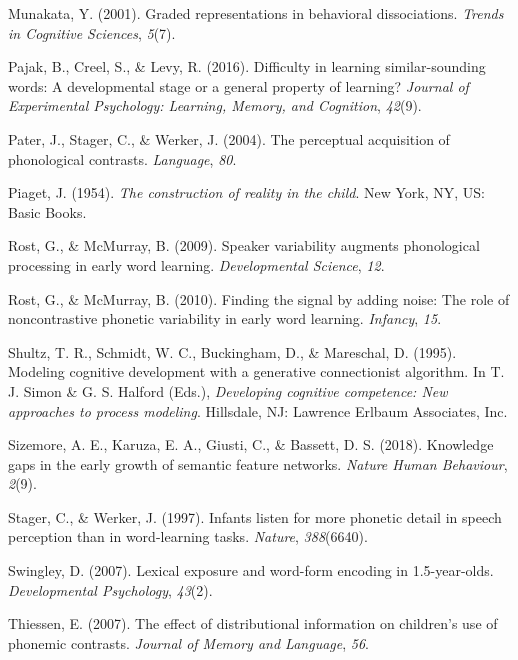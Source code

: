 \documentclass[english,,man]{apa6}
\theoremstyle{definition}
\theoremstyle{definition}
\theoremstyle{definition}
\theoremstyle{remark}
\begin{document}
\hypertarget{ref-Munakata2001}{}
Munakata, Y. (2001). Graded representations in behavioral dissociations.
\emph{Trends in Cognitive Sciences}, \emph{5}(7).

\hypertarget{ref-pajak2016}{}
Pajak, B., Creel, S., \& Levy, R. (2016). Difficulty in learning
similar-sounding words: A developmental stage or a general property of
learning? \emph{Journal of Experimental Psychology: Learning, Memory,
and Cognition}, \emph{42}(9).

\hypertarget{ref-pater2004}{}
Pater, J., Stager, C., \& Werker, J. (2004). The perceptual acquisition
of phonological contrasts. \emph{Language}, \emph{80}.

\hypertarget{ref-piaget1954}{}
Piaget, J. (1954). \emph{The construction of reality in the child}. New
York, NY, US: Basic Books.

\hypertarget{ref-rost2009}{}
Rost, G., \& McMurray, B. (2009). Speaker variability augments
phonological processing in early word learning. \emph{Developmental
Science}, \emph{12}.

\hypertarget{ref-rost2010}{}
Rost, G., \& McMurray, B. (2010). Finding the signal by adding noise:
The role of noncontrastive phonetic variability in early word learning.
\emph{Infancy}, \emph{15}.

\hypertarget{ref-shultz1995}{}
Shultz, T. R., Schmidt, W. C., Buckingham, D., \& Mareschal, D. (1995).
Modeling cognitive development with a generative connectionist
algorithm. In T. J. Simon \& G. S. Halford (Eds.), \emph{Developing
cognitive competence: New approaches to process modeling}. Hillsdale,
NJ: Lawrence Erlbaum Associates, Inc.

\hypertarget{ref-sizemore2018}{}
Sizemore, A. E., Karuza, E. A., Giusti, C., \& Bassett, D. S. (2018).
Knowledge gaps in the early growth of semantic feature networks.
\emph{Nature Human Behaviour}, \emph{2}(9).

\hypertarget{ref-stager1997}{}
Stager, C., \& Werker, J. (1997). Infants listen for more phonetic
detail in speech perception than in word-learning tasks. \emph{Nature},
\emph{388}(6640).

\hypertarget{ref-swingley2007}{}
Swingley, D. (2007). Lexical exposure and word-form encoding in
1.5-year-olds. \emph{Developmental Psychology}, \emph{43}(2).

\hypertarget{ref-thiessen2007}{}
Thiessen, E. (2007). The effect of distributional information on
children's use of phonemic contrasts. \emph{Journal of Memory and
Language}, \emph{56}.
\end{document}
